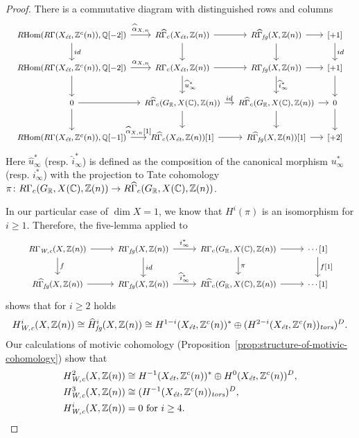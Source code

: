 \documentclass[draft]{article}
\numberwithin{equation}{section}
\begin{document}
\begin{proof}
  There is a commutative diagram with distinguished rows and columns
  \[ \begin{tikzcd}[font=\footnotesize,column sep=1em]
      \RHom (R\Gamma (X_\et, \ZZ^c(n)), \QQ[-2]) \ar{r}{\widehat{\alpha}_{X,n}} \ar{d}{id} &[0pt] R\widehat{\Gamma}_c (X_\et, \ZZ(n)) \ar{d} \ar{r} & R\widehat{\Gamma}_\fg (X, \ZZ(n)) \ar{r}\ar{d} &[-0.5em] {[+1]} \ar{d}{id} \\
      \RHom (R\Gamma (X_\et, \ZZ^c(n)), \QQ[-2]) \ar{r}{\alpha_{X,n}} \ar{d} & R\Gamma_c (X_\et, \ZZ(n)) \ar{r} \ar{d}{\widehat{u}^*_\infty} & R\Gamma_\fg (X, \ZZ(n)) \ar{r} \ar{d}{\widehat{i}^*_\infty} & {[+1]} \ar{d} \\
      0 \ar{r}\ar{d} & R\widehat{\Gamma}_c (G_\RR, X(\CC), \ZZ(n)) \ar{r}{id} \ar{d} & R\widehat{\Gamma}_c (G_\RR, X(\CC), \ZZ(n)) \ar{r} \ar{d} & 0 \ar{d} \\
      \RHom (R\Gamma (X_\et, \ZZ^c(n)), \QQ[-1]) \ar{r}{\widehat{\alpha}_{X,n} [1]} & R\widehat{\Gamma}_c (X_\et, \ZZ(n)) [1] \ar{r} & R\widehat{\Gamma}_\fg (X, \ZZ(n)) [1] \ar{r} & {[+2]}
    \end{tikzcd} \]
  Here $\widehat{u}^*_\infty$ (resp. $\widehat{i}^*_\infty$)
  is defined as the composition of the canonical morphism $u^*_\infty$
  (resp. $i^*_\infty$) with the projection to Tate cohomology
  $\pi\colon R\Gamma_c (G_\RR, X(\CC), \ZZ(n)) \to
  R\widehat{\Gamma}_c (G_\RR, X(\CC), \ZZ(n))$.

  In our particular case of $\dim X = 1$, we know that $H^i (\pi)$
  is an isomorphism for $i \ge 1$. Therefore, the five-lemma applied to
  \[ \begin{tikzcd}[font=\footnotesize]
      R\Gamma_\Wc (X, \ZZ(n)) \ar{r}\ar{d}{f} & R\Gamma_\fg (X, \ZZ(n)) \ar{r}{i^*_\infty}\ar{d}{id} & R\Gamma_c (G_\RR, X(\CC), \ZZ(n)) \ar{r}\ar{d}{\pi} & \cdots [1]\ar{d}{f [1]} \\
      R\widehat{\Gamma}_\fg (X, \ZZ(n)) \ar{r} & R\Gamma_\fg (X, \ZZ(n)) \ar{r}{\widehat{i}^*_\infty} & R\widehat{\Gamma}_c (G_\RR, X(\CC), \ZZ(n)) \ar{r} & \cdots [1]
    \end{tikzcd} \]
  shows that for $i \ge 2$ holds
  \[ H^i_\Wc (X, \ZZ(n)) \cong \widehat{H}^i_\fg (X, \ZZ(n))
    \cong H^{1-i} (X_\et, \ZZ^c(n))^*
    \oplus
    (H^{2-i} (X_\et, \ZZ^c (n))_\tors)^D. \]
  Our calculations of motivic cohomology
  (Proposition~\ref{prop:structure-of-motivic-cohomology}) show that
  \begin{align*}
    H^2_\Wc (X, \ZZ(n)) & \cong H^{-1} (X_\et, \ZZ^c(n))^*
                          \oplus
                          H^0 (X_\et, \ZZ^c (n))^D, \\
    H^3_\Wc (X, \ZZ(n)) & \cong (H^{-1} (X_\et, \ZZ^c (n))_\tors)^D, \\
    H^i_\Wc (X, \ZZ(n)) & = 0 \text{ for }i \ge 4. \qedhere
  \end{align*}
\end{proof}
\end{document}
